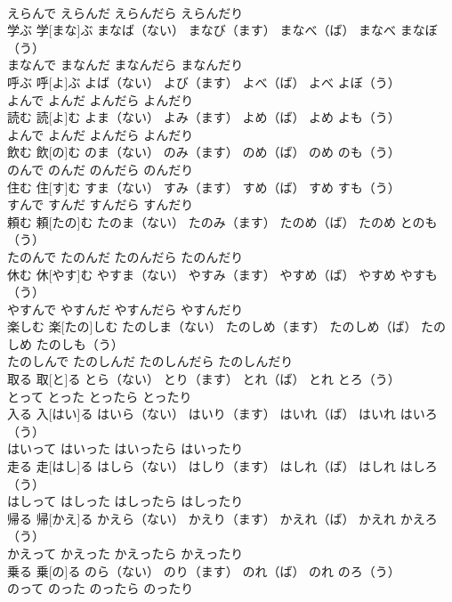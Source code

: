 \documentclass[8pt]{extreport}
\begin{document}
\begin{CJK}{UTF8}{min}
\\	えらんで	えらんだ	えらんだら	えらんだり
\\	学ぶ	学[まな]ぶ	まなば（ない）	まなび（ます）	まなべ（ば）	まなべ	まなぼ（う）	
\\	まなんで	まなんだ	まなんだら	まなんだり
\\	呼ぶ	呼[よ]ぶ	よば（ない）	よび（ます）	よべ（ば）	よべ	よぼ（う）	
\\	よんで	よんだ	よんだら	よんだり
\\	読む	読[よ]む	よま（ない）	よみ（ます）	よめ（ば）	よめ	よも（う）	
\\	よんで	よんだ	よんだら	よんだり
\\	飲む	飲[の]む	のま（ない）	のみ（ます）	のめ（ば）	のめ	のも（う）	
\\	のんで	のんだ	のんだら	のんだり
\\	住む	住[す]む	すま（ない）	すみ（ます）	すめ（ば）	すめ	すも（う）	
\\	すんで	すんだ	すんだら	すんだり
\\	頼む	頼[たの]む	たのま（ない）	たのみ（ます）	たのめ（ば）	たのめ	とのも（う）	
\\	たのんで	たのんだ	たのんだら	たのんだり
\\	休む	休[やす]む	やすま（ない）	やすみ（ます）	やすめ（ば）	やすめ	やすも（う）	
\\	やすんで	やすんだ	やすんだら	やすんだり
\\	楽しむ	楽[たの]しむ	たのしま（ない）	たのしめ（ます）	たのしめ（ば）	たのしめ	たのしも（う）	
\\	たのしんで	たのしんだ	たのしんだら	たのしんだり
\\	取る	取[と]る	とら（ない）	とり（ます）	とれ（ば）	とれ	とろ（う）	
\\	とって	とった	とったら	とったり
\\	入る	入[はい]る	はいら（ない）	はいり（ます）	はいれ（ば）	はいれ	はいろ（う）	
\\	はいって	はいった	はいったら	はいったり
\\	走る	走[はし]る	はしら（ない）	はしり（ます）	はしれ（ば）	はしれ	はしろ（う）	
\\	はしって	はしった	はしったら	はしったり
\\	帰る	帰[かえ]る	かえら（ない）	かえり（ます）	かえれ（ば）	かえれ	かえろ（う）	
\\	かえって	かえった	かえったら	かえったり
\\	乗る	乗[の]る	のら（ない）	のり（ます）	のれ（ば）	のれ	のろ（う）	
\\	のって	のった	のったら	のったり

\end{CJK}
\end{document}
